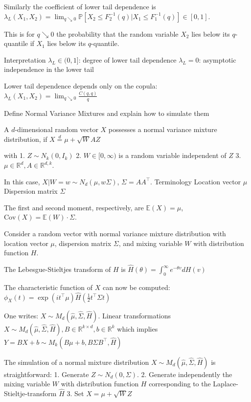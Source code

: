 Similarly the coefficient of lower tail dependence is
\(\lambda_L(X_1, X_2) = \lim_{q \searrow 0} \mathbb{P}[X_2 \le F_2^{-1}(q)|X_1 \le F_1^{-1}(q)] \in [0, 1].\)

This is for \(q \searrow 0\) the probability that the random variable \(X_2\) 
lies below its \(q\)-quantile if \(X_1\) lies below its \(q\)-quantile.

Interpretation
\(\lambda_L \in (0, 1]\): degree of lower tail dependence
\(\lambda_L = 0\): asymptotic independence in the lower tail

Lower tail dependence depends only on the copula:
\(\lambda_L(X_1, X_2) = \lim_{q \searrow 0} \frac{C(q, q)}{q}\)

Define Normal Variance Mixtures and explain how to simulate them

A \(d\)-dimensional random vector \(X\) possesses a normal variance mixture distribution, if
\(X \stackrel{d}{=} \mu + \sqrt{W} AZ\)

with
1. \(Z \sim N_k(0, I_k)\)
2. \(W \in [0, \infty)\) is a random variable independent of \(Z\)
3. \(\mu \in \mathbb{R}^d, A \in \mathbb{R}^{d, k}\).

In this case, \(X|W = w \sim N_d(\mu, w \Sigma)\), \(\Sigma = AA^\top\).
Terminology
Location vector \(\mu\)
Dispersion matrix \(\Sigma\)

The first and second moment, respectively, are \(\mathbb{E}(X) = \mu\), \(\text{Cov}(X) = \mathbb{E}(W) \cdot \Sigma\).


Consider a random vector with normal variance mixture distribution with 
location vector \(\mu\), dispersion matrix \(\Sigma\), and mixing variable \(W\) with distribution function \(H\).

The Lebesgue-Stieltjes transform of \(H\) is
\(\hat{H}(\theta) = \int_0^\infty e^{-\theta v} dH(v)\)
    
The characteristic function of \(X\) can now be computed:
\(\phi_X(t) = \exp(i t^\top \mu) \hat{H} (\frac{1}{2} t^\top \Sigma t)\)
    
One writes: \(X \sim M_d(\hat{\mu}, \hat{\Sigma}, \hat{H})\).
Linear transformations
\(X \sim M_d(\hat{\mu}, \hat{\Sigma}, \hat{H}), B \in \mathbb{R}^{k \times d}, b \in \mathbb{R}^k\)
which implies \(Y = BX + b \sim M_k(B \mu + b, B \Sigma B^\top, \hat{H})\)


The simulation of a normal mixture distribution \(X \sim M_d(\hat{\mu}, \hat{\Sigma}, \hat{H})\) is straightforward:
1. Generate \(Z \sim N_d(0, \Sigma)\).
2. Generate independently the mixing variable \(W\) with distribution function \(H\) 
   corresponding to the Laplace-Stieltje-transform \(\hat{H}\)
3. Set \(X = \mu + \sqrt{W} Z\)

